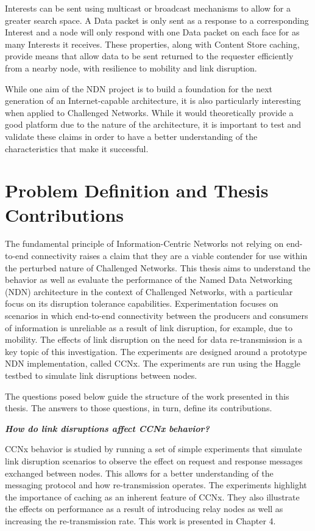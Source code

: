 \documentclass[a4paper,12pt]{report}      %
\begin{document}
Interests can be sent using multicast or broadcast mechanisms to allow for a greater search
space. A Data packet is only sent as a response to a corresponding Interest and a node will only respond
with one Data packet on each face for as many Interests it receives. These properties, along with
Content Store caching, provide means that allow data to be sent returned to the requester efficiently
from a nearby node, with resilience to mobility and link disruption.

While one aim of the NDN project is to build a foundation for the next generation of an Internet-capable
 architecture, it is also particularly interesting when applied to Challenged Networks. While it
would theoretically provide a good platform due to the nature of the architecture, it is important to test
and validate these claims in order to have a better understanding of the characteristics that make it successful\cite{ndnproj}.

\pagebreak
\chapter{Problem Definition and Thesis Contributions}

The fundamental principle of Information-Centric Networks not relying on end-to-end connectivity
raises a claim that they are a viable contender for use within the perturbed nature of
Challenged Networks. This thesis aims to understand the behavior as well as evaluate the performance of
 the Named Data Networking (NDN) architecture in the context of Challenged Networks, with a particular focus 
on its disruption tolerance capabilities. Experimentation focuses on scenarios in which end-to-end connectivity between 
the producers and consumers of information is unreliable as a result of link disruption, for example, due to mobility. 
The effects of link disruption on the need for data re-transmission is a key topic of this investigation.
The experiments are designed around a prototype NDN implementation, called CCNx. The experiments are run using the
Haggle\cite{haggle} testbed to simulate link disruptions between nodes. 

The questions posed below guide the structure of the work presented in this thesis. The answers to those questions, in turn, define its contributions.

\vspace{1em}
\noindent\textbf{\textsl{How do link disruptions affect CCNx behavior?}} \par
CCNx behavior is studied by running a set of simple experiments that simulate link disruption scenarios
to observe the effect on request and response messages exchanged between nodes. This allows for a better understanding 
of the messaging protocol and how re-transmission operates. The experiments highlight the importance of caching as
an inherent feature of CCNx. They also illustrate the effects on performance as a result of introducing relay nodes
as well as increasing the re-transmission rate. This work is presented in Chapter 4. 
\end{document}
